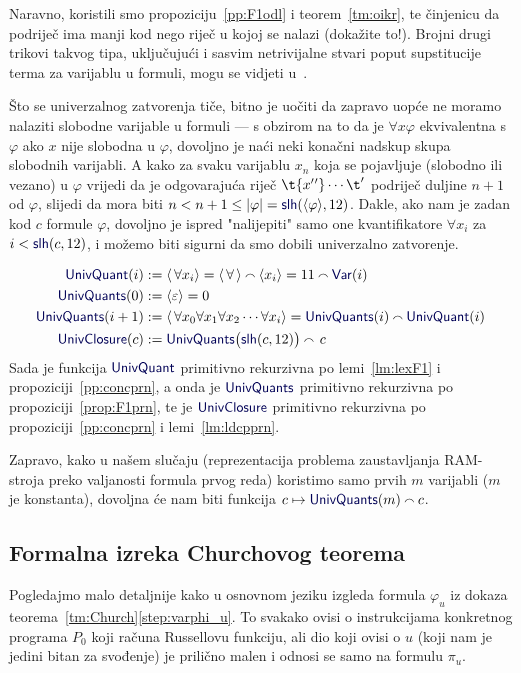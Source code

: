 Naravno, koristili smo propoziciju~\ref{pp:F1odl} i teorem~\ref{tm:oikr}, te činjenicu da podriječ ima manji kod nego riječ u kojoj se nalazi (dokažite to!). Brojni drugi trikovi takvog tipa, uključujući i sasvim netrivijalne stvari poput supstitucije terma za varijablu u formuli, mogu se vidjeti u~\cite{smullyan}.

Što se univerzalnog zatvorenja tiče, bitno je uočiti da zapravo uopće ne moramo nalaziti slobodne varijable u formuli --- s obzirom na to da je $\forall x\varphi$ ekvivalentna s $\varphi$ ako $x$ nije slobodna u $\varphi$, dovoljno je naći neki konačni nadskup skupa slobodnih varijabli. A kako za svaku varijablu $x_n$ koja se pojavljuje (slobodno ili vezano) u $\varphi$ vrijedi da je odgovarajuća riječ $\t{x{}'{}'}\dotsm\t'$ podriječ duljine $n+1$ od $\varphi$, slijedi da mora biti $n<n+1\le\dulj\varphi=\f{slh}(\kr{\varphi},12)$. Dakle, ako nam je zadan kod $c$ formule $\varphi$, dovoljno je ispred "nalijepiti" samo one kvantifikatore $\forall x_i$ za $i<\f{slh}(c,12)$, i možemo biti sigurni da smo dobili univerzalno zatvorenje.

\noindent\begin{align}
    \f{UnivQuant}(i)&:=\kr{\,\forall x_i}=\kr{\,\forall\,}\conc{}\kr{x_i}=11\conc{}\f{Var}(i)\\
    \f{UnivQuants}(0)&:=\kr{\varepsilon}=0\\
    \f{UnivQuants}(i+1)&:=\kr{\,\forall x_0\forall x_1\forall x_2\dotsm\forall x_i}=\f{UnivQuants}(i)\conc{}\f{UnivQuant}(i)\\
    \f{UnivClosure}(c)&:=\f{UnivQuants}\bigl(\f{slh}(c,12)\bigr)\conc{}\,c
\end{align}
Sada je funkcija $\f{UnivQuant}$ primitivno rekurzivna po lemi~\ref{lm:lexF1} i propoziciji~\ref{pp:concprn}, a onda je $\f{UnivQuants}$ primitivno rekurzivna po propoziciji~\ref{prop:F1prn}, te je $\f{UnivClosure}$ primitivno rekurzivna po propoziciji~\ref{pp:concprn} i lemi~\ref{lm:ldcpprn}.

Zapravo, kako u našem slučaju (reprezentacija problema zaustavljanja RAM-stroja preko valjanosti formula prvog reda) koristimo samo prvih $m$ varijabli ($m$ je konstanta), dovoljna će nam biti funkcija $c\mapsto\f{UnivQuants}(m)\conc{}c$.

\subsection{Formalna izreka Churchovog teorema}

Pogledajmo malo detaljnije kako u osnovnom jeziku izgleda formula $\varphi_u$ iz dokaza teorema~\ref{tm:Church}\eqref{step:varphi_u}. To svakako ovisi o instrukcijama konkretnog programa $P_0$ koji računa Russellovu funkciju, ali dio koji ovisi o $u$ (koji nam je jedini bitan za svođenje) je prilično malen i odnosi se samo na formulu $\pi_u$.

